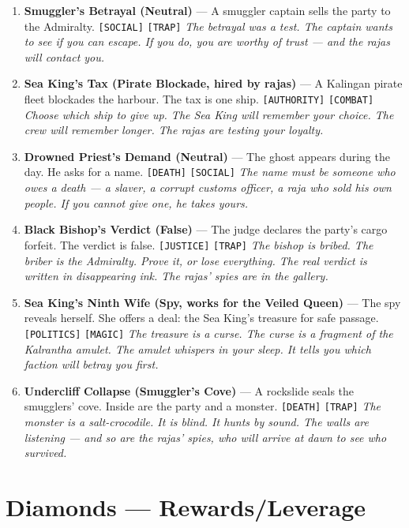 \begin{enumerate}
\item \textbf{Smuggler's Betrayal (Neutral)} --- A smuggler captain sells the party to the Admiralty. \texttt{[SOCIAL]} \texttt{[TRAP]}
  \hfill \textit{The betrayal was a test. The captain wants to see if you can escape. If you do, you are worthy of trust --- and the rajas will contact you.}
\item \textbf{Sea King's Tax (Pirate Blockade, hired by rajas)\textdagger} --- A Kalingan pirate fleet blockades the harbour. The tax is one ship. \texttt{[AUTHORITY]} \texttt{[COMBAT]}
  \hfill \textit{Choose which ship to give up. The Sea King will remember your choice. The crew will remember longer. The rajas are testing your loyalty.}
\item[J] \textbf{Drowned Priest's Demand (Neutral)} --- The ghost appears during the day. He asks for a name. \texttt{[DEATH]} \texttt{[SOCIAL]}
  \hfill \textit{The name must be someone who owes a death --- a slaver, a corrupt customs officer, a raja who sold his own people. If you cannot give one, he takes yours.}
\item[Q] \textbf{Black Bishop's Verdict (False)\textdaggerdbl} --- The judge declares the party's cargo forfeit. The verdict is false. \texttt{[JUSTICE]} \texttt{[TRAP]}
  \hfill \textit{The bishop is bribed. The briber is the Admiralty. Prove it, or lose everything. The real verdict is written in disappearing ink. The rajas' spies are in the gallery.}
\item[K] \textbf{Sea King's Ninth Wife (Spy, works for the Veiled Queen)\textdagger} --- The spy reveals herself. She offers a deal: the Sea King's treasure for safe passage. \texttt{[POLITICS]} \texttt{[MAGIC]}
  \hfill \textit{The treasure is a curse. The curse is a fragment of the Kalrantha amulet. The amulet whispers in your sleep. It tells you which faction will betray you first.}
\item[A] \textbf{Undercliff Collapse (Smuggler's Cove)\textdagger} --- A rockslide seals the smugglers' cove. Inside are the party and a monster. \texttt{[DEATH]} \texttt{[TRAP]}
  \hfill \textit{The monster is a salt-crocodile. It is blind. It hunts by sound. The walls are listening --- and so are the rajas' spies, who will arrive at dawn to see who survived.}
\end{enumerate}

\section*{Diamonds --- Rewards/Leverage}
\label{sec:brasscoast-rewards}

